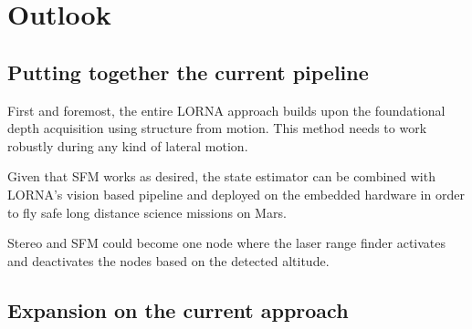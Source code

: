 \chapter{Outlook}
\label{sec:outlook}
\section{Putting together the current pipeline}

First and foremost, the entire LORNA approach builds upon the foundational depth acquisition using structure from motion. This method needs to work robustly during any kind of lateral motion.

Given that SFM works as desired, the state estimator can be combined with LORNA's vision based pipeline and deployed on the embedded hardware in order to fly safe long distance science missions on Mars. 

Stereo and SFM could become one node where the laser range finder activates and deactivates the nodes based on the detected altitude.

\section{Expansion on the current approach}

